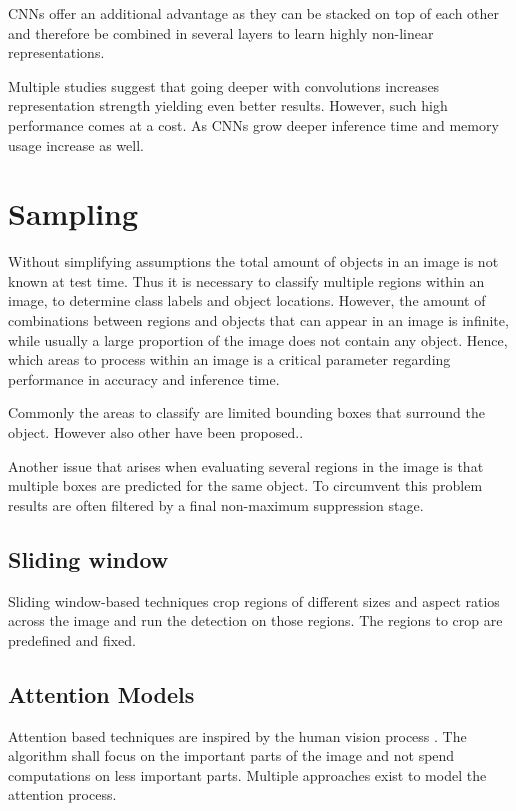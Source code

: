 	\acp{CNN} offer an additional advantage as they can be stacked on top of each other and therefore be combined in several layers to learn highly non-linear representations.
	
	Multiple studies suggest that going deeper with convolutions increases representation strength yielding even better results. However, such high performance comes at a cost. As \acp{CNN} grow deeper inference time and memory usage increase as well.
	
	\section{Sampling}
	
	Without simplifying assumptions the total amount of objects in an image is not known at test time. Thus it is necessary to classify multiple regions within an image, to determine class labels and object locations. However, the amount of combinations between regions and objects that can appear in an image is infinite, while usually a large proportion of the image does not contain any object. Hence, which areas to process within an image is a critical parameter regarding performance in accuracy and inference time.
	
	Commonly the areas to classify are limited bounding boxes that surround the object. However also other have been proposed..	
	
	Another issue that arises when evaluating several regions in the image is that multiple boxes are predicted for the same object. To circumvent this problem results are often filtered by a final non-maximum suppression stage. 
	
	\subsection{Sliding window}
	
	Sliding window-based techniques crop regions of different sizes and aspect ratios across the image and run the detection on those regions. The regions to crop are predefined and fixed. 
	
	\subsection{Attention Models}
	
	Attention based techniques are inspired by the human vision process . The algorithm shall focus on the important parts of the image and not spend computations on less important parts. Multiple approaches exist to model the attention process.
	
